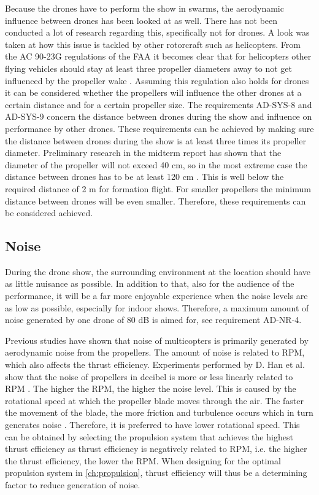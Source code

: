 Because the drones have to perform the show in swarms, the aerodynamic influence between drones has been looked at as well. There has not been conducted a lot of research regarding this, specifically not for drones. A look was taken at how this issue is tackled by other rotorcraft such as helicopters. From the AC 90-23G regulations of the FAA it becomes clear that for helicopters other flying vehicles should stay at least three propeller diameters away to not get influenced by the propeller wake \cite{FAAwake}. Assuming this regulation also holds for drones it can be considered whether the propellers will influence the other drones at a certain distance and for a certain propeller size. The requirements AD-SYS-8 and AD-SYS-9 concern the distance between drones during the show and influence on performance by other drones. These requirements can be achieved by making sure the distance between drones during the show is at least three times its propeller diameter. Preliminary research in the midterm report has shown that the diameter of the propeller will not exceed 40 cm, so in the most extreme case the distance between drones has to be at least 120 cm \cite{midterm}. This is well below the required distance of 2 m for formation flight. For smaller propellers the minimum distance between drones will be even smaller. Therefore, these requirements can be considered achieved.


\subsection{Noise}
\label{subsec:noise}
During the drone show, the surrounding environment at the location should have as little nuisance as possible. In addition to that, also for the audience of the performance, it will be a far more enjoyable experience when the noise levels are as low as possible, especially for indoor shows. Therefore, a maximum amount of noise generated by one drone of 80 dB is aimed for, see requirement AD-NR-4.

Previous studies have shown that noise of multicopters is primarily generated by aerodynamic noise from the propellers. The amount of noise is related to RPM, which also affects the thrust efficiency. Experiments performed by D. Han et al. show that the noise of propellers in decibel is more or less linearly related to RPM \cite{noiseVSrpm}. The higher the RPM, the higher the noise level. This is caused by the rotational speed at which the propeller blade moves through the air. The faster the movement of the blade, the more friction and turbulence occurs which in turn generates noise \cite{aerodynamicnoise}. Therefore, it is preferred to have lower rotational speed. This can be obtained by selecting the propulsion system that achieves the highest thrust efficiency as thrust efficiency is negatively related to RPM, i.e. the higher the thrust efficiency, the lower the RPM. When designing for the optimal propulsion system in \autoref{ch:propulsion}, thrust efficiency will thus be a determining factor to reduce generation of noise.

